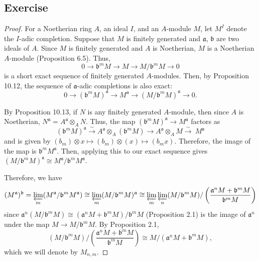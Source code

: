 \subsection{Exercise}\label{10.5}

\begin{proof}
For a Noetherian ring $A$, an ideal $I$, and an $A$-module $M$, let $M^I$ denote the $I$-adic completion. Suppose that $M$ is finitely
generated and $\mathfrak{a}$, $\mathfrak{b}$ are two ideals of $A$. Since $M$ is finitely generated and $A$ is Noetherian, $M$ is a 
Noetherian $A$-module (Proposition 6.5). Thus,
$$0 \to \mathfrak{b}^m M \to M \to M/\mathfrak{b}^m M \to 0$$
is a short exact sequence of finitely generated $A$-modules. Then, by Proposition 10.12, the sequence of $\mathfrak{a}$-adic completions
is also exact:
$$0 \to (\mathfrak{b}^m M)^{\mathfrak{a}} \to M^{\mathfrak{a}} \to (M/\mathfrak{b}^m M)^{\mathfrak{a}} \to 0.$$

By Proposition 10.13, if $N$ is any finitely generated $A$-module, then since $A$ is Noetherian, $N^{\mathfrak{a}} =  A^{\mathfrak{a}} \otimes_A N$.
Thus, the map $(\mathfrak{b}^m M)^{\mathfrak{a}} \to M^{\mathfrak{a}}$ factors as 
$$(\mathfrak{b}^m M)^{\mathfrak{a}} \xrightarrow{\sim} A^{\mathfrak{a}} \otimes_A (\mathfrak{b}^m M) \to A^{\mathfrak{a}} \otimes_A M \xrightarrow{\sim} \ M^{\mathfrak{a}}$$
and is given by $(b_m) \otimes x \mapsto (b_m) \otimes (x) \mapsto (b_m x)$. Therefore, the image of the map is $\mathfrak{b}^m M^{\mathfrak{a}}$. Then,
applying this to our exact sequence gives $(M/\mathfrak{b}^m M)^{\mathfrak{a}} \cong M^{\mathfrak{a}}/\mathfrak{b}^m M^{\mathfrak{a}}$.

Therefore, we have
$$(M^{\mathfrak{a}})^{\mathfrak{b}} = \varprojlim_m (M^{\mathfrak{a}}/\mathfrak{b}^m M^{\mathfrak{a}}) \cong \varprojlim_m (M/\mathfrak{b}^m M)^{\mathfrak{a}} 
\cong \varprojlim_m \varprojlim_n (M/\mathfrak{b}^m M)/\left(\frac{\mathfrak{a}^n M + \mathfrak{b}^m M}{\mathfrak{b}^m M}\right)$$
since $\mathfrak{a}^n(M/\mathfrak{b}^m M) \cong (\mathfrak{a}^n M + \mathfrak{b}^m M)/\mathfrak{b}^m M$ (Proposition 2.1) is the image of $\mathfrak{a}^n$ under the map 
$M \to M/\mathfrak{b}^m M$. By Proposition 2.1, 
$$(M/\mathfrak{b}^m M)/\left(\frac{\mathfrak{a}^n M + \mathfrak{b}^m M}{\mathfrak{b}^m M}\right) \cong M/(\mathfrak{a}^n M + \mathfrak{b}^m M),$$
which we will denote by $M_{n,m}$.


\end{proof}
